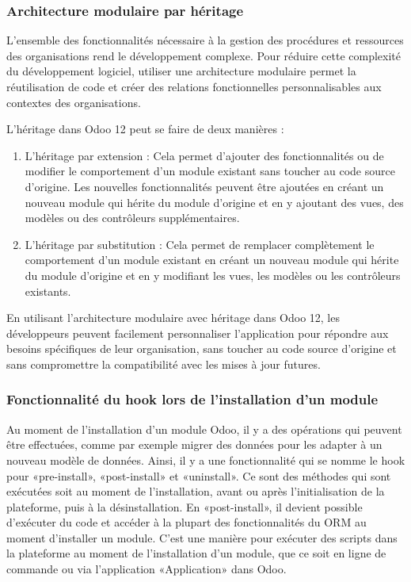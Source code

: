 \subsubsection{Architecture modulaire par héritage}

L'ensemble des fonctionnalités nécessaire à la gestion des procédures et ressources des organisations rend le développement complexe. Pour réduire cette complexité du développement logiciel, utiliser une architecture modulaire permet la réutilisation de code et créer des relations fonctionnelles personnalisables aux contextes des organisations.

L’héritage dans Odoo 12 peut se faire de deux manières : 
\begin{enumerate}
    \item L’héritage par extension : Cela permet d’ajouter des fonctionnalités ou de modifier le comportement d’un module existant sans toucher au code source d’origine. Les nouvelles fonctionnalités peuvent être ajoutées en créant un nouveau module qui hérite du module d’origine et en y ajoutant des vues, des modèles ou des contrôleurs supplémentaires.
    \item L’héritage par substitution : Cela permet de remplacer complètement le comportement d’un module existant en créant un nouveau module qui hérite du module d’origine et en y modifiant les vues, les modèles ou les contrôleurs existants.
\end{enumerate}
En utilisant l’architecture modulaire avec héritage dans Odoo 12, les développeurs peuvent facilement personnaliser l’application pour répondre aux besoins spécifiques de leur organisation, sans toucher au code source d’origine et sans compromettre la compatibilité avec les mises à jour futures.


\subsubsection{Fonctionnalité du hook lors de l’installation d’un module}

Au moment de l’installation d’un module Odoo, il y a des opérations qui peuvent être effectuées, comme par exemple migrer des données pour les adapter à un nouveau modèle de données. Ainsi, il y a une fonctionnalité qui se nomme le hook pour «pre-install», «post-install» et «uninstall». Ce sont des méthodes qui sont exécutées soit au moment de l’installation, avant ou après l’initialisation de la plateforme, puis à la désinstallation. En «post-install», il devient possible d’exécuter du code et accéder à la plupart des fonctionnalités du ORM au moment d’installer un module. C’est une manière pour exécuter des scripts dans la plateforme au moment de l’installation d’un module, que ce soit en ligne de commande ou via l’application «Application» dans Odoo.

